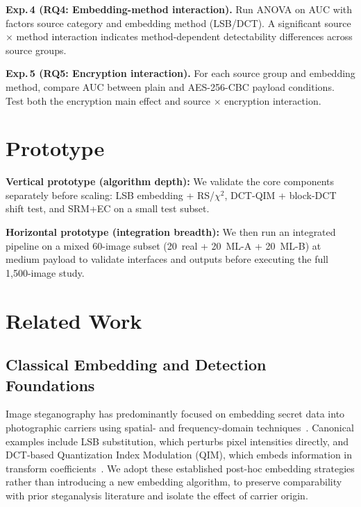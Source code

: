 \documentclass[10pt,twocolumn,a4paper]{article}
\begin{document}
\textbf{Exp.\,4 (RQ4: Embedding-method interaction).} Run ANOVA on AUC with factors source category and embedding method (LSB/DCT). A significant source $\times$ method interaction indicates method-dependent detectability differences across source groups.

\textbf{Exp.\,5 (RQ5: Encryption interaction).} For each source group and embedding method, compare AUC between plain and AES-256-CBC payload conditions. Test both the encryption main effect and source $\times$ encryption interaction.


\section{Prototype}

\textbf{Vertical prototype (algorithm depth):} We validate the core components separately before scaling: LSB embedding + RS/$\chi^2$, DCT-QIM + block-DCT shift test, and SRM+EC on a small test subset.

\textbf{Horizontal prototype (integration breadth):} We then run an integrated pipeline on a mixed 60-image subset (20~real + 20~ML-A + 20~ML-B) at medium payload to validate interfaces and outputs before executing the full 1{,}500-image study.

\section{Related Work}

\subsection{Classical Embedding and Detection Foundations}
Image steganography has predominantly focused on embedding secret data into photographic carriers using spatial- and frequency-domain techniques~\cite{petitcolas1999,cheddad2010,hussain2018}. Canonical examples include LSB substitution, which perturbs pixel intensities directly, and DCT-based Quantization Index Modulation (QIM), which embeds information in transform coefficients~\cite{chen_wornell2001}. We adopt these established post-hoc embedding strategies rather than introducing a new embedding algorithm, to preserve comparability with prior steganalysis literature and isolate the effect of carrier origin.
\end{document}
